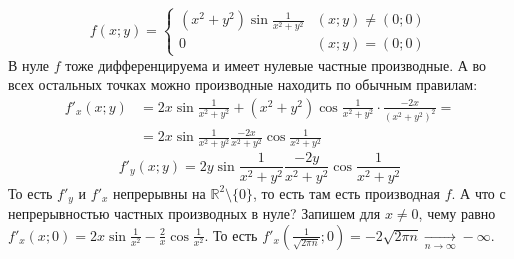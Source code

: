 \documentclass{article}
\begin{document}
\begin{itemize}
\begin{Example}
            $$
            f(x;y)=\begin{cases}
                (x^2+y^2)\sin\frac1{x^2+y^2} & (x;y)\neq(0;0)\\
                0 & (x;y)=(0;0)
            \end{cases}
            $$
            В нуле $f$ тоже дифференцируема и имеет нулевые частные производные. А во всех остальных точках можно производные находить по обычным правилам:
            \[
            \begin{split}
                f'_x(x;y)&=2x\sin\frac1{x^2+y^2}+(x^2+y^2)\cos\frac1{x^2+y^2}\cdot\frac{-2x}{(x^2+y^2)^2}=\\
                &=2x\sin\frac1{x^2+y^2}\frac{-2x}{x^2+y^2}\cos\frac1{x^2+y^2}
            \end{split}
            \]
            \[
            f'_y(x;y)=2y\sin\frac1{x^2+y^2}\frac{-2y}{x^2+y^2}\cos\frac1{x^2+y^2}
            \]
            То есть $f'_y$ и $f'_x$ непрерывны на $\mathbb R^2\setminus\{0\}$, то есть там есть производная $f$. А что с непрерывностью частных производных в нуле? Запишем для $x\neq0$, чему равно $f'_x(x;0)=2x\sin\frac1{x^2}-\frac2x\cos\frac1{x^2}$. То есть $f'_x\left(\frac1{\sqrt{2\pi n}};0\right)=-2\sqrt{2\pi n}\underset{n\to\infty}\longrightarrow-\infty$.
        \end{Example}
    \end{itemize}
\end{document}
